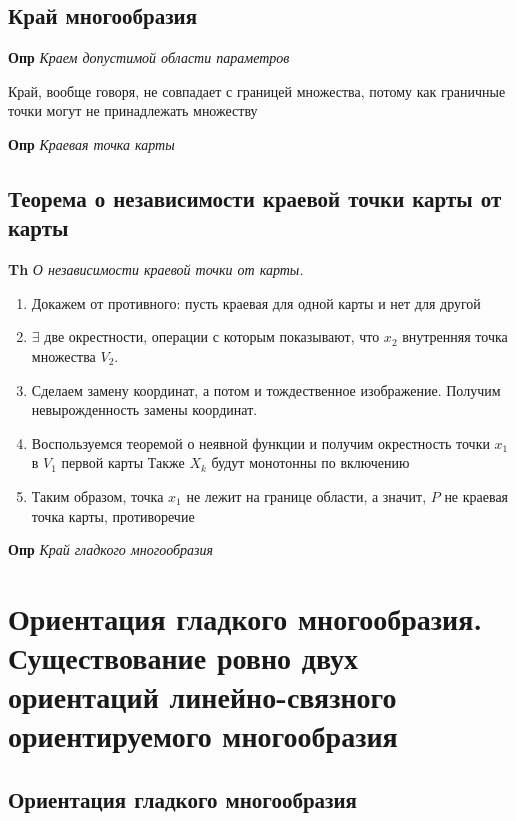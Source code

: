 \documentclass[a4paper, 14pt]{article}
\begin{document}
    \subsection{Край многообразия}
    
    \textbf{Опр} \textit{Краем допустимой области параметров}
    
    Край, вообще говоря, не совпадает с границей множества, потому как граничные точки могут не принадлежать множеству
    
    \textbf{Опр} \textit{Краевая точка карты}
    
    \subsection{Теорема о независимости краевой точки карты от карты}
    
    \textbf{Th} \textit{О независимости краевой точки от карты.}
    
    \begin{enumerate}
        \item Докажем от противного: пусть краевая для одной карты и нет для другой
        \item $\exists$ две окрестности, операции с которым показывают, что $x_2$ внутренняя точка множества $V_2$.
        \item Сделаем замену координат, а потом и тождественное изображение.
        Получим невырожденность замены координат.
        \item Воспользуемся теоремой о неявной функции и получим окрестность точки $x_1$ в $V_1$ первой карты
        Также $X_k$ будут монотонны по включению
        \item Таким образом, точка $x_1$ не лежит на границе области, а значит, $P$ не краевая точка карты, противоречие
    \end{enumerate}
    
    \textbf{Опр} \textit{Край гладкого многообразия}
    
    \section{Ориентация гладкого многообразия.
    Существование ровно двух ориентаций линейно-связного ориентируемого многообразия}
    
    \subsection{Ориентация гладкого многообразия}
    
\end{document}
